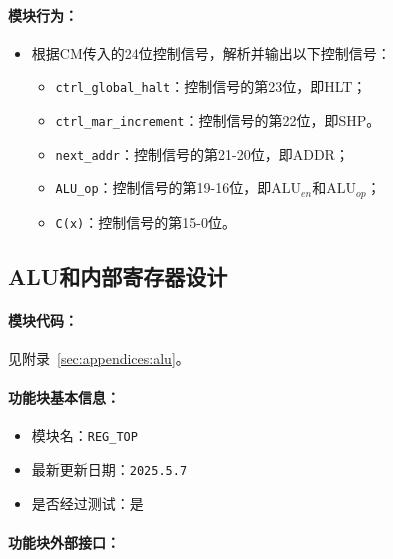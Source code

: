 \documentclass[lang=cn,a4paper,newtx]{elegantpaper}
\begin{document}
\paragraph{模块行为：}
\begin{itemize}
  \item 根据CM传入的24位控制信号，解析并输出以下控制信号：
    \begin{itemize}
      \item \texttt{ctrl\_global\_halt}：控制信号的第23位，即HLT；
      \item \texttt{ctrl\_mar\_increment}：控制信号的第22位，即SHP。
      \item \texttt{next\_addr}：控制信号的第21-20位，即ADDR；
      \item \texttt{ALU\_op}：控制信号的第19-16位，即$\text{ALU}_{en}$和$\text{ALU}_{op}$；
      \item \texttt{C(x)}：控制信号的第15-0位。
    \end{itemize}
\end{itemize}


\subsection{ALU和内部寄存器设计}

\paragraph{模块代码：}
见附录~\ref{sec:appendices:alu}。

\paragraph{功能块基本信息：}
\begin{itemize}
  \item 模块名：\texttt{REG\_TOP}
  \item 最新更新日期：\texttt{2025.5.7}
  \item 是否经过测试：是
\end{itemize}

\paragraph{功能块外部接口：}
\end{document}
